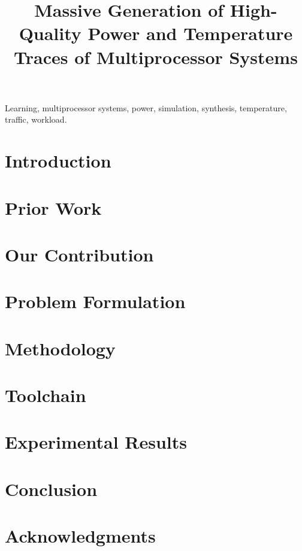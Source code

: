 \documentclass[conference]{IEEEtran}
\title{
  Massive Generation of High-Quality Power and Temperature Traces of
  Multiprocessor Systems
}
\author{}
\begin{document}
  \maketitle

  \begin{abstract}
    
  \end{abstract}

  \begin{IEEEkeywords}
    Learning,
    multiprocessor systems,
    power,
    simulation,
    synthesis,
    temperature,
    traffic,
    workload.
  \end{IEEEkeywords}


  \section{Introduction} 
  

  \section{Prior Work}
  

  \section{Our Contribution}
  

  \section{Problem Formulation} 
  

  \section{Methodology}
  

  \section{Toolchain}
  

  \section{Experimental Results}

  \section{Conclusion}
  

  \section*{Acknowledgments}
  

  \begingroup
    
    
  \endgroup
\end{document}
